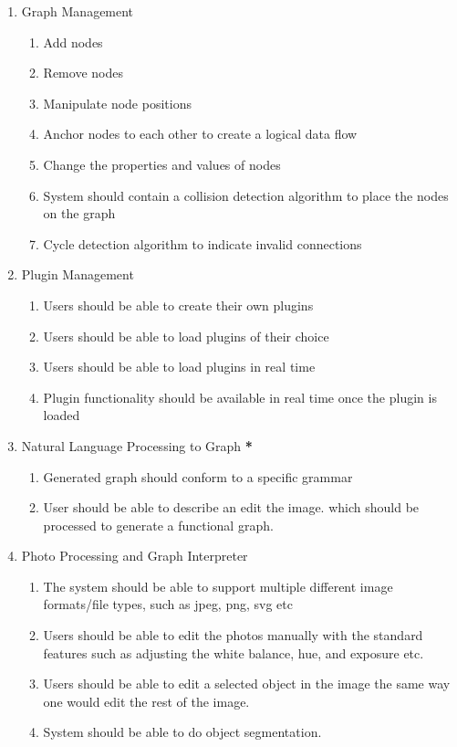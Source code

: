 \documentclass[11pt,a4paper]{article}
\begin{document}
\begin{enumerate}[label=\arabic*.]
    \item Graph Management
    \begin{enumerate}[label*=\arabic*.]
        \item Add nodes
        \item Remove nodes
        \item Manipulate node positions
        \item Anchor nodes to each other to create a logical data flow
        \item Change the properties and values of nodes
        \item System should contain a collision detection algorithm to
        place the nodes on the graph
        \item Cycle detection algorithm to indicate invalid connections
    \end{enumerate}

    \item Plugin Management
    \begin{enumerate}[label*=\arabic*.]
        \item Users should be able to create their own plugins
        \item Users should be able to load plugins of their choice
        \item Users should be able to load plugins in real time
        \item Plugin functionality should be available in real time once the plugin is loaded
    \end{enumerate}
    
    \item Natural Language Processing to Graph \textbf{*}
    \begin{enumerate}[label*=\arabic*.]
        \item Generated graph should conform to a specific grammar
        \item User should be able to describe an edit the image.
        which should be processed to generate a functional graph.
    \end{enumerate}
    
    \item Photo Processing and Graph Interpreter
    \begin{enumerate}[label*=\arabic*.]
        \item The system should be able to support multiple different image formats/file
        types, such as jpeg, png, svg etc 
        \item Users should be able to edit the photos manually with the standard 
        features such as adjusting the white balance, hue, and exposure etc. 
        \item Users should be able to edit a selected object in the image the 
        same way one would edit the rest of the image. 
        \item System should be able to do object segmentation.
    \end{enumerate}


\end{enumerate}
\end{document}
